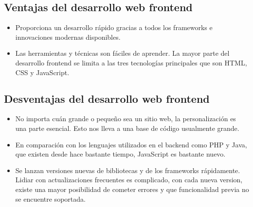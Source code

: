 \subsection*{Ventajas del desarrollo web frontend}
\begin{itemize}
    \item Proporciona un desarrollo rápido gracias a todos los
     frameworks e innovaciones modernas disponibles.
    \item Las herramientas y técnicas son fáciles de aprender. La mayor
    parte del desarrollo frontend se limita a las tres tecnologías principales que son HTML, CSS y JavaScript. 
\end{itemize}

\subsection*{Desventajas del desarrollo web frontend}
\begin{itemize}
    \item No importa cuán grande o pequeño sea un sitio web, la
     personalización es una parte esencial. Esto nos lleva a una base de código usualmente grande.
    \item En comparación con los lenguajes utilizados en el backend
     como PHP y Java, que existen desde hace bastante tiempo, JavaScript es bastante nuevo.
    \item Se lanzan versiones nuevas de bibliotecas y de los frameworks rápidamente.
     Lidiar con actualizaciones frecuentes es complicado, con cada nueva version,
      existe una mayor posibilidad de cometer errores y que funcionalidad previa no se encuentre soportada.
\end{itemize}